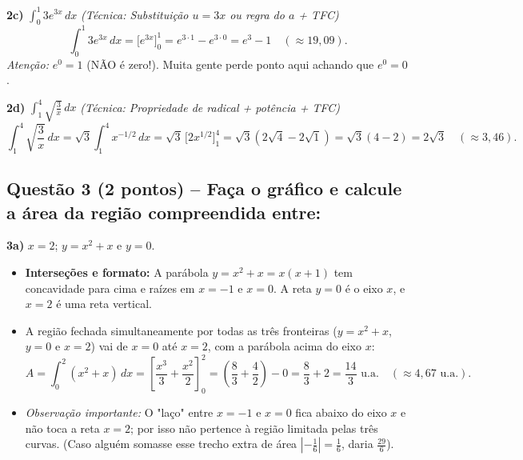 \documentclass[10pt,a4paper]{article}
\begin{document}
\medskip
\textbf{2c)} $\displaystyle \int_{0}^{1} 3e^{3x}\,dx$ \quad \textit{(Técnica: Substituição $u = 3x$ ou regra do $a$ + TFC)}
\[
    \int_{0}^{1} 3e^{3x}\,dx = \Big[ e^{3x} \Big]_{0}^{1} = e^{3\cdot 1} - e^{3\cdot 0} = \boxed{e^3 - 1} \quad (\approx 19{,}09).
\]
\textit{Atenção:} $e^0 = 1$ (NÃO é zero!). Muita gente perde ponto aqui achando que $e^0 = 0$.

\medskip
\textbf{2d)} $\displaystyle \int_{1}^{4} \sqrt{\frac{3}{x}}\,dx$ \quad \textit{(Técnica: Propriedade de radical + potência + TFC)}
\[
    \int_{1}^{4} \sqrt{\frac{3}{x}}\,dx = \sqrt{3}\int_{1}^{4} x^{-1/2}\,dx = \sqrt{3}\,\Big[ 2x^{1/2} \Big]_{1}^{4} = \sqrt{3}\left(2\sqrt{4} - 2\sqrt{1}\right) = \sqrt{3}(4 - 2) = \boxed{2\sqrt{3}} \quad (\approx 3{,}46).
\]

\subsection*{Questão 3 (2 pontos) -- Faça o gráfico e calcule a área da região compreendida entre:}

\textbf{3a)} $x = 2$; \quad $y = x^2 + x$ \quad e \quad $y = 0$.
\begin{itemize}
    \item \textbf{Interseções e formato:} A parábola $y = x^2 + x = x(x+1)$ tem concavidade para cima e raízes em $x = -1$ e $x = 0$. A reta $y = 0$ é o eixo $x$, e $x = 2$ é uma reta vertical.
    \item A região fechada simultaneamente por todas as três fronteiras ($y = x^2 + x$, $y = 0$ e $x = 2$) vai de $x = 0$ até $x = 2$, com a parábola acima do eixo $x$:
          \[
              A = \int_{0}^{2} (x^2 + x)\,dx = \left[\frac{x^3}{3} + \frac{x^2}{2}\right]_{0}^{2} = \left(\frac{8}{3} + \frac{4}{2}\right) - 0 = \frac{8}{3} + 2 = \boxed{\frac{14}{3} \text{ u.a.}} \quad (\approx 4{,}67 \text{ u.a.}).
          \]
    \item \textit{Observação importante:} O "laço" entre $x=-1$ e $x=0$ fica abaixo do eixo $x$ e não toca a reta $x=2$; por isso não pertence à região limitada pelas três curvas. (Caso alguém somasse esse trecho extra de área $\left|-\frac{1}{6}\right| = \frac{1}{6}$, daria $\frac{29}{6}$).
\end{itemize}

\begin{center}
\end{center}
\end{document}
